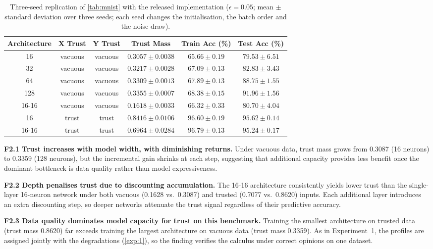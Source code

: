 \begin{table}[ht]
\centering
\begin{tabular}{cccccc}
\hline
Architecture & X Trust & Y Trust & Trust Mass & Train Acc (\%) & Test Acc (\%) \\
\hline
16 & vacuous & vacuous & $0.3057 \pm 0.0038$ & $65.66 \pm 0.19$ & $79.53 \pm 6.51$ \\
32 & vacuous & vacuous & $0.3217 \pm 0.0028$ & $67.09 \pm 0.13$ & $82.83 \pm 3.43$ \\
64 & vacuous & vacuous & $0.3309 \pm 0.0013$ & $67.89 \pm 0.13$ & $88.75 \pm 1.55$ \\
128 & vacuous & vacuous & $0.3355 \pm 0.0007$ & $68.38 \pm 0.15$ & $91.96 \pm 1.56$ \\
16-16 & vacuous & vacuous & $0.1618 \pm 0.0033$ & $66.32 \pm 0.33$ & $80.70 \pm 4.04$ \\
16 & trust & trust & $0.8416 \pm 0.0106$ & $96.60 \pm 0.19$ & $95.62 \pm 0.14$ \\
16-16 & trust & trust & $0.6964 \pm 0.0284$ & $96.79 \pm 0.13$ & $95.24 \pm 0.17$ \\
\hline
\end{tabular}
\caption{Three-seed replication of \cref{tab:mnist} with the released implementation ($\epsilon = 0.05$; mean $\pm$ standard deviation over three seeds; each seed changes the initialisation, the batch order and the noise draw).}
\label{tab:mnist_seeds}
\end{table}

\begin{tcolorbox}[title=Key findings -- Experiment 2, colback=gray!5,
colframe=gray!40, fonttitle=\bfseries, left=4pt, right=4pt,
top=4pt, bottom=4pt]

\textbf{F2.1 Trust increases with model width, with diminishing returns.} Under vacuous data, trust mass grows from 0.3087 (16 neurons) to 0.3359 (128 neurons), but the incremental gain shrinks at each step, suggesting that additional capacity provides less benefit once the dominant bottleneck is data quality rather than model expressiveness.

\medskip
\textbf{F2.2 Depth penalises trust due to discounting accumulation.} The 16-16 architecture consistently yields lower trust than the single-layer 16-neuron network under both vacuous (0.1628 vs.\ 0.3087) and trusted (0.7077 vs.\ 0.8620) inputs. Each additional layer introduces an extra discounting step, so deeper networks attenuate the trust signal regardless of their predictive accuracy.

\medskip
\textbf{F2.3 Data quality dominates model capacity for trust on this benchmark.} Training the smallest architecture on trusted data (trust mass 0.8620) far exceeds training the largest architecture on vacuous data (trust mass 0.3359). As in Experiment~1, the profiles are assigned jointly with the degradations (\cref{exp:1}), so the finding verifies the calculus under correct opinions on one dataset.
\end{tcolorbox}


